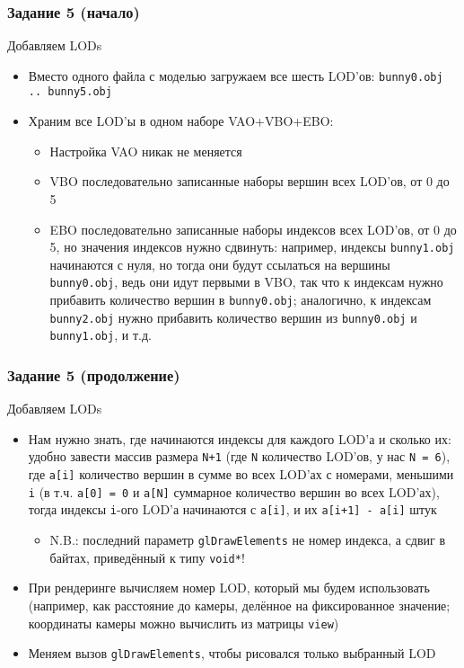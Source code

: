 \documentclass{beamer}
\begin{document}
\begin{frame}[fragile]
\fontsize{10pt}{10pt}
\frametitle{Задание 5 (начало)}
Добавляем LODs
\begin{itemize}
\item Вместо одного файла с моделью загружаем все шесть LOD'ов: \verb|bunny0.obj .. bunny5.obj|
\pause
\item Храним все LOD'ы в одном наборе VAO+VBO+EBO:
\begin{itemize}
\item Настройка VAO никак не меняется
\item VBO \textendash{} последовательно записанные наборы вершин всех LOD'ов, от 0 до 5
\item EBO \textendash{} последовательно записанные наборы индексов всех LOD'ов, от 0 до 5, но значения индексов нужно сдвинуть: например, индексы \verb|bunny1.obj| начинаются с нуля, но тогда они будут ссылаться на вершины \verb|bunny0.obj|, ведь они идут первыми в VBO, так что к индексам нужно прибавить количество вершин в \verb|bunny0.obj|; аналогично, к индексам \verb|bunny2.obj| нужно прибавить количество вершин из \verb|bunny0.obj| и \verb|bunny1.obj|, и т.д.
\end{itemize}
\end{itemize}
\end{frame}

\begin{frame}[fragile]
\fontsize{10pt}{10pt}
\frametitle{Задание 5 (продолжение)}
Добавляем LODs
\begin{itemize}
\item Нам нужно знать, где начинаются индексы для каждого LOD'а и сколько их: удобно завести массив размера \verb|N+1| (где \verb|N| \textendash{} количество LOD'ов, у нас \verb|N = 6|), где \verb|a[i]| \textendash{} количество вершин в сумме во всех LOD'ах с номерами, меньшими \verb|i| (в т.ч. \verb|a[0] = 0| и \verb|a[N]| \textendash{} суммарное количество вершин во всех LOD'ах), тогда индексы \verb|i|-ого LOD'а начинаются с \verb|a[i]|, и их \verb|a[i+1] - a[i]| штук
\begin{itemize}
\item N.B.: последний параметр \verb|glDrawElements| \textendash{} не номер индекса, а сдвиг в байтах, приведённый к типу \verb|void*|!
\end{itemize}
\pause
\item При рендеринге вычисляем номер LOD, который мы будем использовать (например, как расстояние до камеры, делённое на фиксированное значение; координаты камеры можно вычислить из матрицы \verb|view|)
\pause
\item Меняем вызов \verb|glDrawElements|, чтобы рисовался только выбранный LOD
\end{itemize}
\end{frame}
\end{document}
